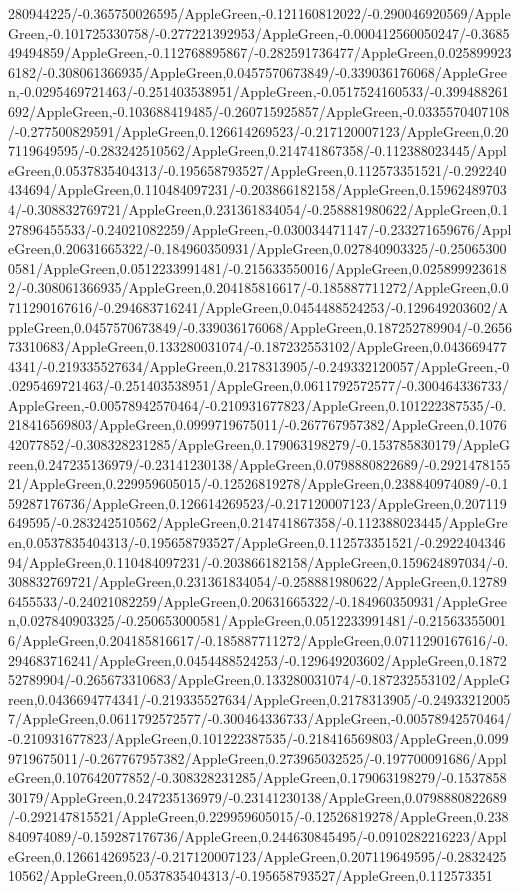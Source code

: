 {\begin{tikzternal}
{280944225/-0.365750026595/AppleGreen,-0.121160812022/-0.290046920569/AppleGreen,-0.101725330758/-0.277221392953/AppleGreen,-0.000412560050247/-0.368549494859/AppleGreen,-0.112768895867/-0.282591736477/AppleGreen,0.0258999236182/-0.308061366935/AppleGreen,0.0457570673849/-0.339036176068/AppleGreen,-0.0295469721463/-0.251403538951/AppleGreen,-0.0517524160533/-0.399488261692/AppleGreen,-0.103688419485/-0.260715925857/AppleGreen,-0.0335570407108/-0.277500829591/AppleGreen,0.126614269523/-0.217120007123/AppleGreen,0.207119649595/-0.283242510562/AppleGreen,0.214741867358/-0.112388023445/AppleGreen,0.0537835404313/-0.195658793527/AppleGreen,0.112573351521/-0.292240434694/AppleGreen,0.110484097231/-0.203866182158/AppleGreen,0.159624897034/-0.308832769721/AppleGreen,0.231361834054/-0.258881980622/AppleGreen,0.127896455533/-0.24021082259/AppleGreen,-0.030034471147/-0.233271659676/AppleGreen,0.20631665322/-0.184960350931/AppleGreen,0.027840903325/-0.250653000581/AppleGreen,0.0512233991481/-0.215633550016/AppleGreen,0.0258999236182/-0.308061366935/AppleGreen,0.204185816617/-0.185887711272/AppleGreen,0.0711290167616/-0.294683716241/AppleGreen,0.0454488524253/-0.129649203602/AppleGreen,0.0457570673849/-0.339036176068/AppleGreen,0.187252789904/-0.265673310683/AppleGreen,0.133280031074/-0.187232553102/AppleGreen,0.0436694774341/-0.219335527634/AppleGreen,0.2178313905/-0.249332120057/AppleGreen,-0.0295469721463/-0.251403538951/AppleGreen,0.0611792572577/-0.300464336733/AppleGreen,-0.00578942570464/-0.210931677823/AppleGreen,0.101222387535/-0.218416569803/AppleGreen,0.0999719675011/-0.267767957382/AppleGreen,0.107642077852/-0.308328231285/AppleGreen,0.179063198279/-0.153785830179/AppleGreen,0.247235136979/-0.23141230138/AppleGreen,0.0798880822689/-0.292147815521/AppleGreen,0.229959605015/-0.12526819278/AppleGreen,0.238840974089/-0.159287176736/AppleGreen,0.126614269523/-0.217120007123/AppleGreen,0.207119649595/-0.283242510562/AppleGreen,0.214741867358/-0.112388023445/AppleGreen,0.0537835404313/-0.195658793527/AppleGreen,0.112573351521/-0.292240434694/AppleGreen,0.110484097231/-0.203866182158/AppleGreen,0.159624897034/-0.308832769721/AppleGreen,0.231361834054/-0.258881980622/AppleGreen,0.127896455533/-0.24021082259/AppleGreen,0.20631665322/-0.184960350931/AppleGreen,0.027840903325/-0.250653000581/AppleGreen,0.0512233991481/-0.215633550016/AppleGreen,0.204185816617/-0.185887711272/AppleGreen,0.0711290167616/-0.294683716241/AppleGreen,0.0454488524253/-0.129649203602/AppleGreen,0.187252789904/-0.265673310683/AppleGreen,0.133280031074/-0.187232553102/AppleGreen,0.0436694774341/-0.219335527634/AppleGreen,0.2178313905/-0.249332120057/AppleGreen,0.0611792572577/-0.300464336733/AppleGreen,-0.00578942570464/-0.210931677823/AppleGreen,0.101222387535/-0.218416569803/AppleGreen,0.0999719675011/-0.267767957382/AppleGreen,0.273965032525/-0.197700091686/AppleGreen,0.107642077852/-0.308328231285/AppleGreen,0.179063198279/-0.153785830179/AppleGreen,0.247235136979/-0.23141230138/AppleGreen,0.0798880822689/-0.292147815521/AppleGreen,0.229959605015/-0.12526819278/AppleGreen,0.238840974089/-0.159287176736/AppleGreen,0.244630845495/-0.0910282216223/AppleGreen,0.126614269523/-0.217120007123/AppleGreen,0.207119649595/-0.283242510562/AppleGreen,0.0537835404313/-0.195658793527/AppleGreen,0.112573351}
\end{tikzternal}}
